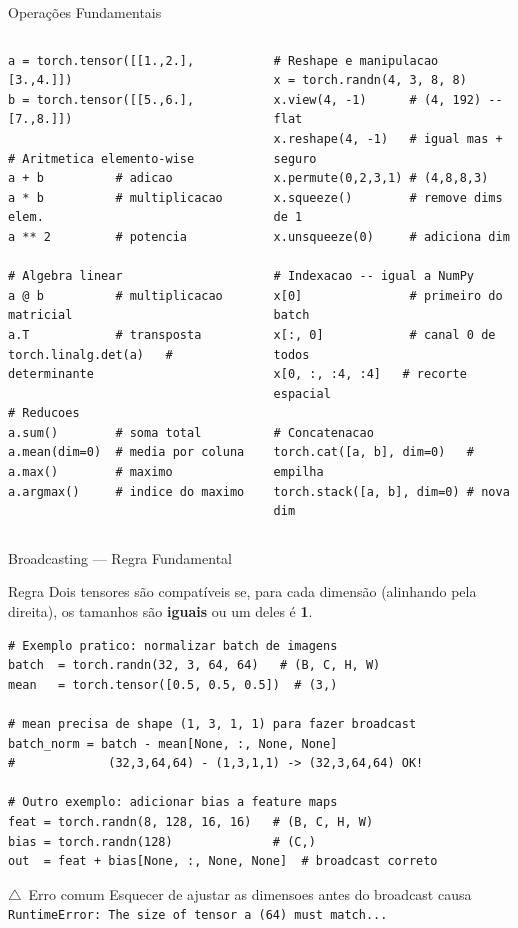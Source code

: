 \documentclass[aspectratio=169, 10pt]{beamer}
\newcommand{\faExclamationTriangle}{$\triangle$}
\begin{document}
\begin{frame}[fragile]{Operações Fundamentais}
\begin{columns}
\begin{lstlisting}
a = torch.tensor([[1.,2.],[3.,4.]])
b = torch.tensor([[5.,6.],[7.,8.]])

# Aritmetica elemento-wise
a + b          # adicao
a * b          # multiplicacao elem.
a ** 2         # potencia

# Algebra linear
a @ b          # multiplicacao matricial
a.T            # transposta
torch.linalg.det(a)   # determinante

# Reducoes
a.sum()        # soma total
a.mean(dim=0)  # media por coluna
a.max()        # maximo
a.argmax()     # indice do maximo
\end{lstlisting}

\begin{lstlisting}
# Reshape e manipulacao
x = torch.randn(4, 3, 8, 8)
x.view(4, -1)      # (4, 192) -- flat
x.reshape(4, -1)   # igual mas + seguro
x.permute(0,2,3,1) # (4,8,8,3)
x.squeeze()        # remove dims de 1
x.unsqueeze(0)     # adiciona dim

# Indexacao -- igual a NumPy
x[0]               # primeiro do batch
x[:, 0]            # canal 0 de todos
x[0, :, :4, :4]   # recorte espacial

# Concatenacao
torch.cat([a, b], dim=0)   # empilha
torch.stack([a, b], dim=0) # nova dim
\end{lstlisting}
\end{columns}
\end{frame}


\begin{frame}[fragile]{Broadcasting — Regra Fundamental}
\begin{block}{Regra}
  Dois tensores são compatíveis se, para cada dimensão (alinhando pela direita), 
  os tamanhos são \textbf{iguais} ou um deles é \textbf{1}.
\end{block}

\begin{lstlisting}
# Exemplo pratico: normalizar batch de imagens
batch  = torch.randn(32, 3, 64, 64)   # (B, C, H, W)
mean   = torch.tensor([0.5, 0.5, 0.5])  # (3,)

# mean precisa de shape (1, 3, 1, 1) para fazer broadcast
batch_norm = batch - mean[None, :, None, None]
#             (32,3,64,64) - (1,3,1,1) -> (32,3,64,64) OK!

# Outro exemplo: adicionar bias a feature maps
feat = torch.randn(8, 128, 16, 16)   # (B, C, H, W)
bias = torch.randn(128)              # (C,)
out  = feat + bias[None, :, None, None]  # broadcast correto
\end{lstlisting}

\begin{alertblock}{\faExclamationTriangle\ Erro comum}
  Esquecer de ajustar as dimensoes antes do broadcast causa
  \texttt{RuntimeError: The size of tensor a (64) must match...}
\end{alertblock}
\end{frame}
\end{document}
